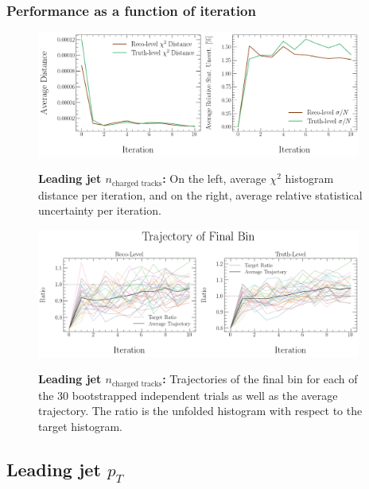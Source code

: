 \subsubsection{Performance as a function of iteration}
\begin{figure}[!htb]
\centering
\includegraphics[width=0.95\textwidth]{figures/num_iterations_study/Ntracks_trackj1/iteration_study_30x10-distances-and-stat-uncert.png}\\
\caption{\textbf{Leading jet $n_{\text{charged tracks}}$:} On the left, average $\chi^2$ histogram distance per iteration, and on the right, average relative statistical uncertainty per iteration.}
\label{fig:num_iterations:ntracks_distances_stat_uncert}
\end{figure}
\begin{figure}[!htb]
\centering
\includegraphics[width=0.95\textwidth]{figures/num_iterations_study/Ntracks_trackj1/iteration_study_30x10-final_bin.png}\\
\caption{\textbf{Leading jet $n_{\text{charged tracks}}$:} Trajectories of the final bin for each of the 30 bootstrapped independent trials as well as the average trajectory. The ratio is the unfolded histogram with respect to the target histogram.}
\label{fig:num_iterations:ntracks_final_bin}
\end{figure}
\clearpage

\subsection{Leading jet $p_T$}

